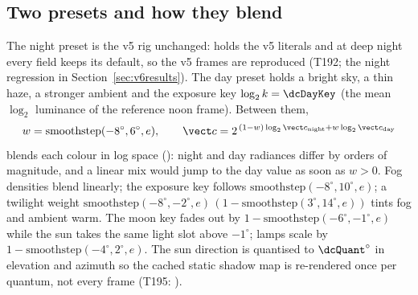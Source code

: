 \subsection{Two presets and how they blend}
The night preset is the v5 rig unchanged:  holds the v5 literals and at deep night every field keeps its default, so the v5 frames are reproduced (T192; the night regression in Section~\ref{sec:v6results}). The day preset holds a bright sky, a thin haze, a stronger ambient and the exposure key $\log_2 k=\dcDayKey$ (the mean $\log_2$ luminance of the reference noon frame). Between them,
\begin{equation}
w=\mathrm{smoothstep}(-8^\circ,6^\circ,e),\qquad \vect c=2^{\,(1-w)\log_2\vect c_\text{night}+w\log_2\vect c_\text{day}}
\end{equation}
blends each colour in log space (): night and day radiances differ by orders of magnitude, and a linear mix would jump to the day value as soon as $w>0$. Fog densities blend linearly; the exposure key follows $\mathrm{smoothstep}(-8^\circ,10^\circ,e)$; a twilight weight $\mathrm{smoothstep}(-8^\circ,-2^\circ,e)\,(1-\mathrm{smoothstep}(3^\circ,14^\circ,e))$ tints fog and ambient warm. The moon key fades out by $1-\mathrm{smoothstep}(-6^\circ,-1^\circ,e)$ while the sun takes the same light slot above $-1^\circ$; lamps scale by $1-\mathrm{smoothstep}(-4^\circ,2^\circ,e)$. The sun direction is quantised to $\dcQuant^\circ$ in elevation and azimuth so the cached static shadow map is re-rendered once per quantum, not every frame (T195: ).

